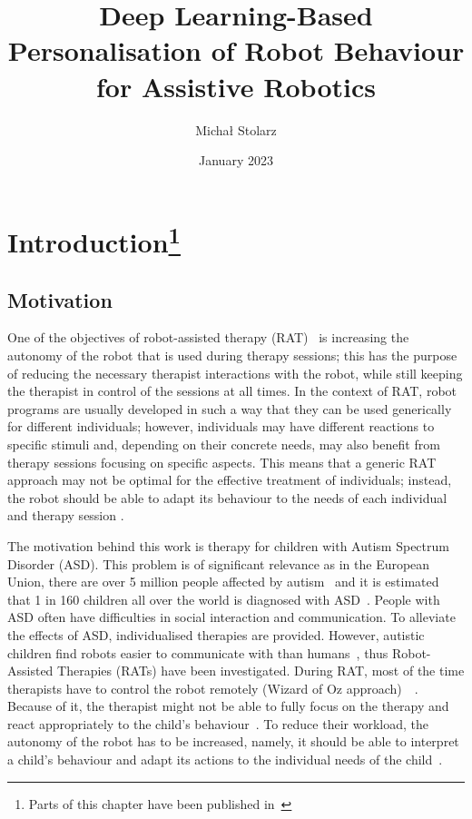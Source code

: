 \documentclass[thesis]{mas_proposal}
\title{Deep Learning-Based Personalisation of Robot Behaviour for Assistive Robotics}
\author{Michał Stolarz}
\date{January 2023}
\begin{document}
\maketitle

\pagestyle{plain}

\section[Introduction]{Introduction\footnote{Parts of this chapter have been published in~\cite{stolarz2022personalized,stolarz2022learningbased}}}

\subsection{Motivation}
One of the objectives of robot-assisted therapy (RAT)~\cite{esteban2017build} is increasing the autonomy of the robot that is used during therapy sessions; this has the purpose of reducing the necessary therapist interactions with the robot, while still keeping the therapist in control of the sessions at all times.
In the context of RAT, robot programs are usually developed in such a way that they can be used generically for different individuals; however, individuals may have different reactions to specific stimuli and, depending on their concrete needs, may also benefit from therapy sessions focusing on specific aspects.
This means that a generic RAT approach may not be optimal for the effective treatment of individuals; instead, the robot should be able to adapt its behaviour to the needs of each individual and therapy session \cite{esteban2017build,scassellati2018improving,rudovic2018personalized}.

The motivation behind this work is therapy for children with Autism Spectrum Disorder (ASD). 
This problem is of significant relevance as in the European Union, there are over 5 million people affected by autism~\cite{deenigma2022} and it is estimated that 1 in 160 children all over the world is diagnosed with ASD~\cite{jain2020modeling}. 
People with ASD often have difficulties in social interaction and communication. 
To alleviate the effects of ASD, individualised therapies are provided. 
However, autistic children find robots easier to communicate with than humans~\cite{robins2006}, thus Robot-Assisted Therapies (RATs) have been investigated. During RAT, most of the time therapists have to control the robot remotely (Wizard of Oz approach)~\cite{deenigma2022}~\cite{david2018developing,robins2017developing,rudovic2017measuring,marinoiu20183d}. 
Because of it, the therapist might not be able to fully focus on the therapy and react appropriately to the child's behaviour~\cite{cao2018personalized}. 
To reduce their workload, the autonomy of the robot has to be increased, namely, it should be able to interpret a child’s behaviour and adapt its actions to the individual needs of the child~\cite{esteban2017build}.
\end{document}
